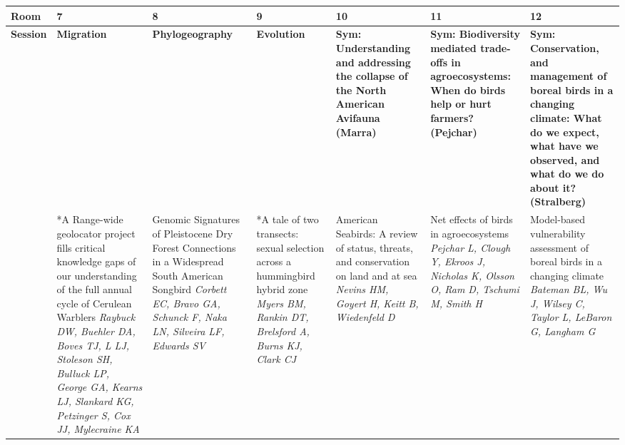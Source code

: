 \begin{tabular}{|x{0.75cm}|x{2.25cm}|x{2.25cm}|x{2.25cm}|a{2.25cm}|a{2.25cm}|a{2.25cm}|}\hline
Room & 7 & 8 & 9 & 10 & 11 & 12\\
\hline
\rule{0pt}{1em} \textbf{Session} &\footnotesize \textbf{Migration} & \footnotesize \textbf{Phylogeography} & \footnotesize \textbf{Evolution} & \footnotesize \textbf{Sym: Understanding and addressing the collapse of the North American Avifauna (Marra)} & \footnotesize \textbf{Sym: Biodiversity mediated trade-offs in agroecosystems: When do birds help or hurt farmers? (Pejchar)} & \footnotesize \textbf{Sym: Conservation, and management of boreal birds in a changing climate: What do we expect, what have we observed, and what do we do about it? (Stralberg)}\\
\hline
{}&*A Range-wide geolocator project fills critical knowledge gaps of our understanding of the full annual cycle of Cerulean Warblers \newline \newline \textit{Raybuck DW, Buehler DA, Boves TJ, L LJ, Stoleson SH, Bulluck LP, George GA, Kearns LJ, Slankard KG, Petzinger S, Cox JJ, Mylecraine KA} & Genomic Signatures of Pleistocene Dry Forest Connections in a Widespread South American Songbird \newline \newline \textit{Corbett EC, Bravo GA, Schunck F, Naka LN, Silveira LF, Edwards SV} & *A tale of two transects: sexual selection across a hummingbird hybrid zone \newline \newline \textit{Myers BM, Rankin DT, Brelsford A, Burns KJ, Clark CJ} & American Seabirds: A review of status, threats, and conservation on land and at sea \newline \newline \textit{Nevins HM, Goyert H, Keitt B, Wiedenfeld D} & Net effects of birds in agroecosystems \newline \newline \textit{Pejchar L, Clough Y, Ekroos J, Nicholas K, Olsson O, Ram D, Tschumi M, Smith H} & Model-based vulnerability assessment of boreal birds in a changing climate \newline \newline \textit{Bateman BL, Wu J, Wilsey C, Taylor L, LeBaron G, Langham G}\\
\hline

\end{tabular}
